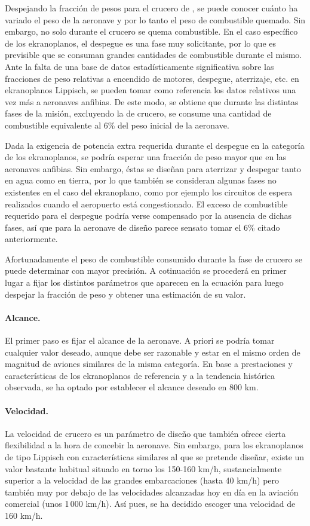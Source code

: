Despejando la fracción de pesos para el crucero de , se puede conocer cuánto ha variado el peso de la aeronave y por lo tanto el peso de combustible quemado. Sin embargo, no solo durante el crucero se quema combustible. En el caso específico de los ekranoplanos, el despegue es una fase muy solicitante, por lo que es previsible que se consuman grandes cantidades de combustible durante el mismo. Ante la falta de una base de datos estadísticamente significativa sobre las fracciones de peso relativas a encendido de motores, despegue, aterrizaje, etc. en ekranoplanos Lippisch, se pueden tomar como referencia los datos relativos una vez más a aeronaves anfibias. De este modo, se obtiene \cite{ref:roskam} que durante las distintas fases de la misión, excluyendo la de crucero, se consume una cantidad de combustible equivalente al 6\% del peso inicial de la aeronave.

Dada la exigencia de potencia extra requerida durante el despegue en la categoría de los ekranoplanos, se podría esperar una fracción de peso mayor que en las aeronaves anfibias. Sin embargo, éstas se diseñan para aterrizar y despegar tanto en agua como en tierra, por lo que también se consideran algunas fases no existentes en el caso del ekranoplano, como por ejemplo los circuitos de espera realizados cuando el aeropuerto está congestionado. El exceso de combustible requerido para el despegue podría verse compensado por la ausencia de dichas fases, así que para la aeronave de diseño parece sensato tomar el 6\% citado anteriormente.

Afortunadamente el peso de combustible consumido durante la fase de crucero se puede determinar con mayor precisión. A cotinuación se procederá en primer lugar a fijar los distintos parámetros que aparecen en la ecuación  para luego despejar la fracción de peso y obtener una estimación de su valor.

\paragraph{Alcance.} El primer paso es fijar el alcance de la aeronave. A priori se podría tomar cualquier valor deseado, aunque debe ser razonable y estar en el mismo orden de magnitud de aviones similares de la misma categoría. En base a prestaciones y características de los ekranoplanos de referencia y a la tendencia histórica observada, se ha optado por establecer el alcance deseado en 800 km.

\paragraph{Velocidad.} La velocidad de crucero es un parámetro de diseño que también ofrece cierta flexibilidad a la hora de concebir la aeronave. Sin embargo, para los ekranoplanos de tipo Lippisch con características similares al que se pretende diseñar, existe un valor bastante habitual situado en torno los 150-160 km/h, sustancialmente superior a la velocidad de las grandes embarcaciones (hasta 40 km/h) pero también muy por debajo de las velocidades alcanzadas hoy en día en la aviación comercial (unos 1\,000 km/h). Así pues, se ha decidido escoger una velocidad de 160 km/h.

